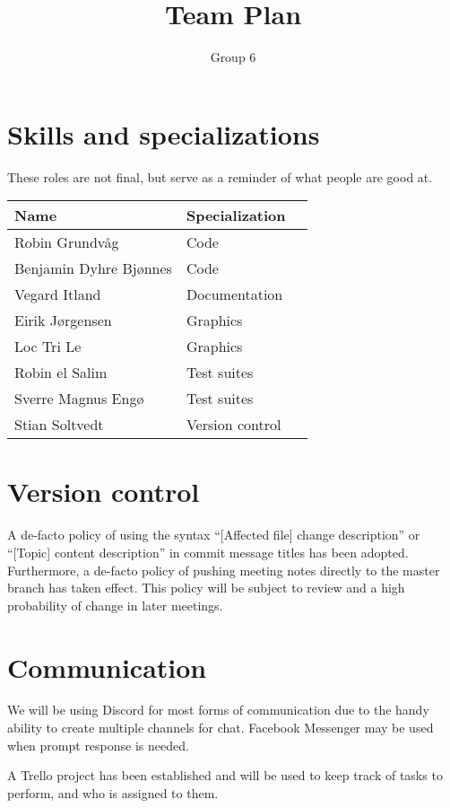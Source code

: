 \documentclass{article}
\title{Team Plan}
\author{Group 6}
\begin{document}
\maketitle

\section*{Skills and specializations}

These roles are not final, but serve as a reminder of what people are good at. \\

\begin{tabular}{l l l}
    Name                   & Specialization \\
    \midrule
    Robin Grundvåg         & Code \\
    Benjamin Dyhre Bjønnes & Code \\
    Vegard Itland          & Documentation \\
    Eirik Jørgensen        & Graphics \\
    Loc Tri Le             & Graphics \\
    Robin el Salim         & Test suites \\
    Sverre Magnus Engø     & Test suites \\
    Stian Soltvedt         & Version control \\
\end{tabular}

\section*{Version control}

A de-facto policy of using the syntax ``[Affected file] change description'' or ``[Topic] content description'' in commit message titles has been adopted. Furthermore, a de-facto policy of pushing meeting notes directly to the master branch has taken effect. This policy will be subject to review and a high probability of change in later meetings.

\section*{Communication}

We will be using Discord for most forms of communication due to the handy ability to create multiple channels for chat. Facebook Messenger may be used when prompt response is needed.

A Trello project has been established and will be used to keep track of tasks to perform, and who is assigned to them.
\end{document}
